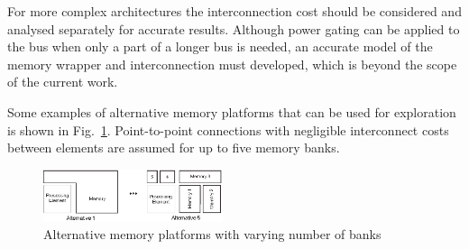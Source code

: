 \documentclass[a4paper,conference]{IEEEtran}
\begin{document}
For more complex architectures the interconnection cost should be considered and analysed separately for accurate results. Although power gating can be applied to the bus when only a part of a longer bus is needed, an accurate model of the memory wrapper and interconnection must developed, which is beyond the scope of the current work. 

Some examples of alternative memory platforms that can be used for exploration is shown in Fig.~\ref{fig:platform}. Point-to-point connections with negligible interconnect costs between elements are assumed for up to five memory banks.

\begin{figure}[!t]
\centering
\includegraphics[width=0.47\textwidth]{Images/platform.eps}
\caption{Alternative memory platforms with varying number of banks}
\label{fig:platform}
\end{figure}
\end{document}
